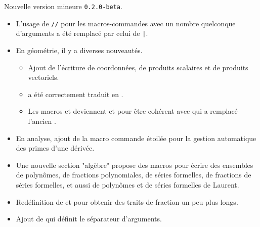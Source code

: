Nouvelle version mineure \verb+0.2.0-beta+.

\begin{itemize}[itemsep=.5em]
    \item L'usage de \verb+//+ pour les macros-commandes avec un nombre quelconque d'arguments a été remplacé par celui de \verb+|+.


    \item En géométrie, il y a diverses nouveautés.
    \begin{itemize}[itemsep=.5em]
        \item Ajout de l'écriture de coordonnées, de produits scalaires et de produits vectoriels.

        \item {} a été correctement traduit en .

        \item Les macros  et  deviennent  et  pour être cohérent avec  qui a remplacé l'ancien .
    \end{itemize}


    \item En analyse, ajout de la macro commande étoilée  pour la gestion automatique des primes d'une dérivée.


    \item Une nouvelle section "algèbre" propose des macros pour écrire des ensembles de polynômes, de fractions polynomiales, de séries formelles, de fractions de séries formelles, et aussi de polynômes et de séries formelles de Laurent.


    \item Redéfinition de  et  pour obtenir des traits de fraction un peu plus longs.


    \item Ajout de  qui définit le séparateur d'arguments.
\end{itemize}

